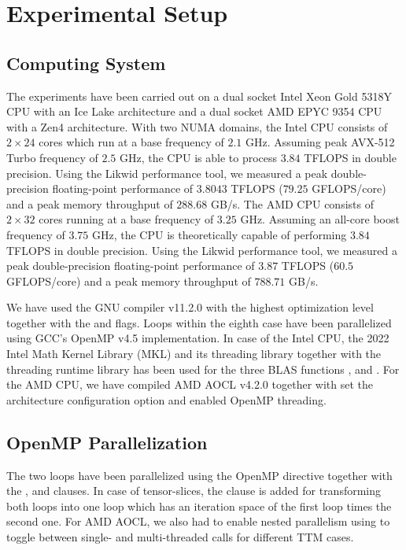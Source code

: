 \section{Experimental Setup}
\label{sec:experimental.setup}
\subsection{Computing System} 
The experiments have been carried out on a dual socket Intel Xeon Gold 5318Y CPU with an Ice Lake architecture and a dual socket AMD EPYC 9354 CPU with a Zen4 architecture.
With two NUMA domains, the Intel CPU consists of $2\times24$ cores which run at a base frequency of $2.1$ GHz.
Assuming peak AVX-512 Turbo frequency of $2.5$ GHz, the CPU is able to process $3.84$ TFLOPS in double precision.
Using the Likwid performance tool, we measured a peak double-precision floating-point performance of $3.8043$ TFLOPS ($79.25$ GFLOPS/core) and a peak memory throughput of $288.68$ GB/s.
The AMD CPU consists of $2\times32$ cores running at a base frequency of $3.25$ GHz.
Assuming an all-core boost frequency of $3.75$ GHz, the CPU is theoretically capable of performing $3.84$ TFLOPS in double precision.
Using the Likwid performance tool, we measured a peak double-precision floating-point performance of $3.87$ TFLOPS ($60.5$ GFLOPS/core) and a peak memory throughput of $788.71$ GB/s.
 
We have used the GNU compiler v11.2.0 with the highest optimization level  together with the  and  flags. 
Loops within the eighth case have been parallelized using GCC's OpenMP v4.5 implementation.
In case of the Intel CPU, the 2022 Intel Math Kernel Library (MKL) and its threading library  together with the threading runtime library  has been used for the three BLAS functions ,  and .
For the AMD CPU, we have compiled AMD AOCL v4.2.0 together with set the  architecture configuration option and enabled OpenMP threading.


\subsection{OpenMP Parallelization}
The two  loops have been parallelized using the OpenMP directive  together with the ,  and \allowbreak{} clauses.
In case of tensor-slices, the  clause is added for transforming both loops into one loop which has an iteration space of the first loop times the second one. 
For AMD AOCL, we also had to enable nested parallelism using  to toggle between single- and multi-threaded  calls for different TTM cases.

